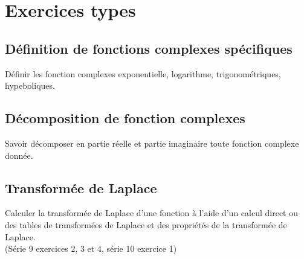 \section{Exercices types}
\subsection{Définition de fonctions complexes spécifiques}
Définir les fonction complexes exponentielle, logarithme, trigonométriques, hypeboliques.

\subsection{Décomposition de fonction complexes}
Savoir décomposer en partie réelle et partie imaginaire toute fonction complexe donnée.










\subsection{Transformée de Laplace}
Calculer la transformée de Laplace d’une fonction à l’aide d’un calcul direct ou des tables de transformées de Laplace et des propriétés de la transformée de Laplace. \\
(Série 9 exercices 2, 3 et 4, série 10 exercice 1)




